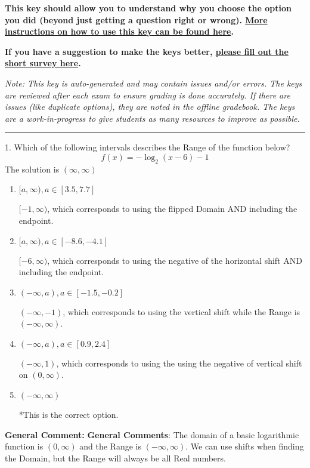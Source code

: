\documentclass{extbook}[14pt]
\begin{document}
\textbf{This key should allow you to understand why you choose the option you did (beyond just getting a question right or wrong). \href{https://xronos.clas.ufl.edu/mac1105spring2020/courseDescriptionAndMisc/Exams/LearningFromResults}{More instructions on how to use this key can be found here}.}

\textbf{If you have a suggestion to make the keys better, \href{https://forms.gle/CZkbZmPbC9XALEE88}{please fill out the short survey here}.}

\textit{Note: This key is auto-generated and may contain issues and/or errors. The keys are reviewed after each exam to ensure grading is done accurately. If there are issues (like duplicate options), they are noted in the offline gradebook. The keys are a work-in-progress to give students as many resources to improve as possible.}

\rule{\textwidth}{0.4pt}

1. Which of the following intervals describes the Range of the function below?
\[ f(x) = -\log_2{(x-6)}-1 \] 
The solution is $ (\infty, \infty) $ 

\begin{enumerate}[label=\Alph*.] 
\item $ [a, \infty), a \in [3.5, 7.7] $ 

 $[-1, \infty)$, which corresponds to using the flipped Domain AND including the endpoint. 
\item $ [a, \infty), a \in [-8.6, -4.1] $ 

 $[-6, \infty)$, which corresponds to using the negative of the horizontal shift AND including the endpoint. 
\item $ (-\infty, a), a \in [-1.5, -0.2] $ 

 $(-\infty, -1)$, which corresponds to using the vertical shift while the Range is $(-\infty, \infty)$. 
\item $ (-\infty, a), a \in [0.9, 2.4] $ 

 $(-\infty, 1)$, which corresponds to using the using the negative of vertical shift on $(0, \infty)$. 
\item $ (-\infty, \infty) $ 

 *This is the correct option. 
\end{enumerate} 
 
\textbf{General Comment:} \textbf{General Comments}: The domain of a basic logarithmic function is $(0, \infty)$ and the Range is $(-\infty, \infty)$. We can use shifts when finding the Domain, but the Range will always be all Real numbers. 
\end{document}

